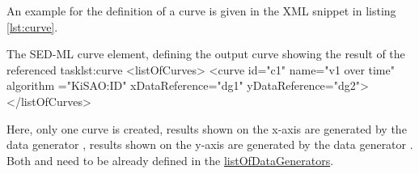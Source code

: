 An example for the definition of a curve is given in the XML snippet in listing \ref{lst:curve}.
%
\begin{myXmlLst}{The SED-ML curve element, defining the output curve showing the result of the referenced task}{lst:curve}
<listOfCurves>
  <curve id="c1" name="v1 over time" algorithm ="KiSAO:ID" xDataReference="dg1" yDataReference="dg2">
</listOfCurves>
\end{myXmlLst}
Here, only one curve is created, results shown on the x-axis are generated by the data generator , results shown on the y-axis are generated by the data generator . Both  and  need to be already defined in the \hyperref[sec:listOfDataGenerators]{listOfDataGenerators}.




